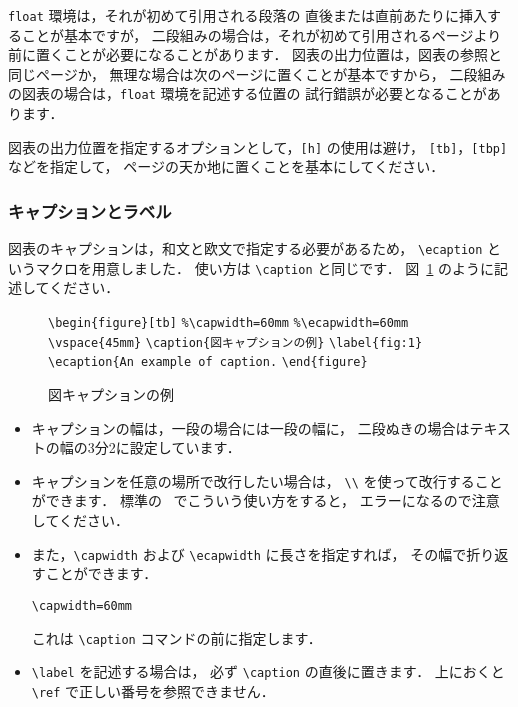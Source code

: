 \documentclass[technicalreport]{ieicej}
\begin{document}
\texttt{float} 環境は，それが初めて引用される段落の
直後または直前あたりに挿入することが基本ですが，
二段組みの場合は，それが初めて引用されるページより
前に置くことが必要になることがあります．
図表の出力位置は，図表の参照と同じページか，
無理な場合は次のページに置くことが基本ですから，
二段組みの図表の場合は，\texttt{float} 環境を記述する位置の
試行錯誤が必要となることがあります．

図表の出力位置を指定するオプションとして，\texttt{[h]} の使用は避け，
\texttt{[tb]}，\texttt{[tbp]} などを指定して，
ページの天か地に置くことを基本にしてください．

\subsubsection{キャプションとラベル}

図表のキャプションは，和文と欧文で指定する必要があるため，
\verb/\ecaption/ というマクロを用意しました．
使い方は \verb/\caption/ と同じです．
図~\ref{fig:1} のように記述してください．


\begin{figure}[t]%
\vbox{%
\hbox{\verb/\begin{figure}[tb]/}
\hbox{\verb/%\capwidth=60mm/}
\hbox{\verb/%\ecapwidth=60mm/}
\hbox{\verb/\vspace{45mm}/}
\hbox{\verb/\caption{図キャプションの例}/}
\hbox{\verb/\label{fig:1}/}
\hbox{\verb/\ecaption{An example of caption./}
\hbox{\verb/\end{figure}/}
}
\begin{center}
\end{center}
\caption{図キャプションの例}
\label{fig:1}
\end{figure}


\begin{itemize}
\item
キャプションの幅は，一段の場合には一段の幅に，
二段ぬきの場合はテキストの幅の3分2に設定しています．

\item
キャプションを任意の場所で改行したい場合は，
\verb/\\/ を使って改行することができます．
標準の \LaTeXe\ でこういう使い方をすると，
エラーになるので注意してください．

\item
また，\verb/\capwidth/ および \verb/\ecapwidth/ に長さを指定すれば，
その幅で折り返すことができます．
\begin{verbatim}
\capwidth=60mm
\end{verbatim}
これは \verb/\caption/ コマンドの前に指定します．

\item
\verb/\label/ を記述する場合は，
必ず \verb/\caption/ の直後に置きます．
上におくと \verb/\ref/ で正しい番号を参照できません．
\end{itemize}
\end{document}
